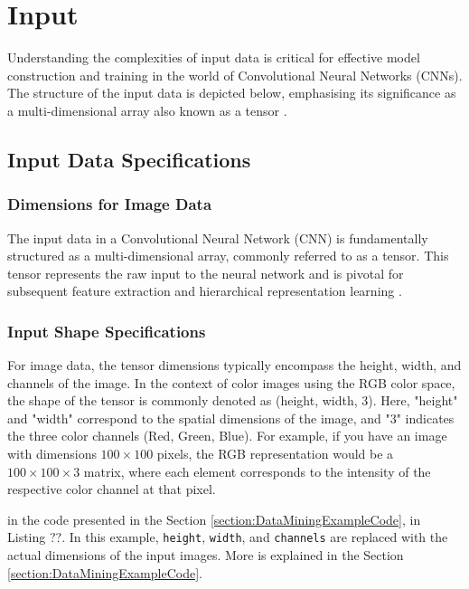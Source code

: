 \section{Input}

Understanding the complexities of input data is critical for effective model construction and training in the world of Convolutional Neural Networks (CNNs). The structure of the input data is depicted below, emphasising its significance as a multi-dimensional array also known as a tensor \cite{Xu:2022}.


\subsection{Input Data Specifications}


\subsubsection{Dimensions for Image Data}

The input data in a Convolutional Neural Network (CNN) is fundamentally structured as a multi-dimensional array, commonly referred to as a tensor. This tensor represents the raw input to the neural network and is pivotal for subsequent feature extraction and hierarchical representation learning \cite{War:2020}.

\subsubsection{Input Shape Specifications}

For image data, the tensor dimensions typically encompass the height, width, and channels of the image. In the context of color images using the RGB color space, the shape of the tensor is commonly denoted as (height, width, 3). Here, "height" and "width" correspond to the spatial dimensions of the image, and "3" indicates the three color channels (Red, Green, Blue). For example, if you have an image with dimensions $100 \times 100$ pixels, the RGB representation would be a $100 \times 100 \times 3$ matrix, where each element corresponds to the intensity of the respective color channel at that pixel.

in the code presented in the Section \ref{section:DataMiningExampleCode}, in Listing ??. In this example, \texttt{height}, \texttt{width}, and \texttt{channels} are replaced with the actual dimensions of the input images. More is explained in the Section \ref{section:DataMiningExampleCode}.


